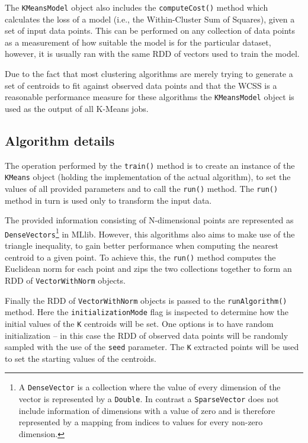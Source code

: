 \documentclass{l4proj}
\begin{document}
The \texttt{KMeansModel} object also includes the \texttt{computeCost()} method which calculates the loss of a model (i.e., the Within-Cluster Sum of Squares), given a set of input data points. This can be performed on any collection of data points as a measurement of how suitable the model is for the particular dataset, however, it is usually ran with the same RDD of vectors used to train the model.

Due to the fact that most clustering algorithms are merely trying to generate a set of centroids to fit against observed data points and that the WCSS is a reasonable performance measure for these algorithms the \texttt{KMeansModel} object is used as the output of all K-Means jobs.

\subsection{Algorithm details}

The operation performed by the \texttt{train()} method is to create an instance of the \texttt{KMeans} object (holding the implementation of the actual algorithm), to set the values of all provided parameters and to call the \texttt{run()} method. The \texttt{run()} method in turn is used only to transform the input data. 

The provided information consisting of N-dimensional points are represented as \texttt{DenseVectors}\footnote{A \texttt{DenseVector} is a collection where the value of every dimension of the vector is represented by a \texttt{Double}. In contrast a \texttt{SparseVector} does not include information of dimensions with a value of zero and is therefore represented by a mapping from indices to values for every non-zero dimension.} in MLlib. However, this algorithms also aims to make use of the triangle inequality, to gain better performance when computing the nearest centroid to a given point\cite{Triangle}. To achieve this, the \texttt{run()} method computes the Euclidean norm for each point and zips the two collections together to form an RDD of \texttt{VectorWithNorm} objects.

Finally the RDD of \texttt{VectorWithNorm} objects is passed to the \texttt{runAlgorithm()} method. Here the \texttt{initializationMode} flag is inspected to determine how the initial values of the \texttt{K} centroids will be set. One options is to have random initialization -- in this case the RDD of observed data points will be randomly sampled with the use of the \texttt{seed} parameter. The \texttt{K} extracted points will be used to set the starting values of the centroids. 
\end{document}
